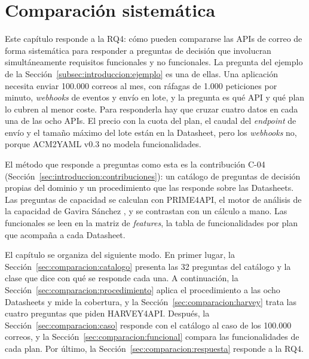 \chapter{Comparación sistemática}
\label{cap:comparacion}

Este capítulo responde a la RQ4: cómo pueden compararse las APIs de correo de forma sistemática para responder a preguntas de decisión que involucran simultáneamente requisitos funcionales y no funcionales.
La pregunta del ejemplo de la Sección~\ref{subsec:introduccion:ejemplo} es una de ellas.
Una aplicación necesita enviar 100.000 correos al mes, con ráfagas de 1.000 peticiones por minuto, \textit{webhooks} de eventos y envío en lote, y la pregunta es qué API y qué plan lo cubren al menor coste.
Para responderla hay que cruzar cuatro datos en cada una de las ocho APIs.
El precio con la cuota del plan, el caudal del \textit{endpoint} de envío y el tamaño máximo del lote están en la Datasheet, pero los \textit{webhooks} no, porque ACM2YAML v0.3 no modela funcionalidades.

El método que responde a preguntas como esta es la contribución C-04 (Sección~\ref{sec:introduccion:contribuciones}): un catálogo de preguntas de decisión propias del dominio y un procedimiento que las responde sobre las Datasheets.
Las preguntas de capacidad se calculan con PRIME4API, el motor de análisis de la capacidad de Gavira Sánchez \citep{gavira2026tfm}, y se contrastan con un cálculo a mano.
Las funcionales se leen en la matriz de \textit{features}, la tabla de funcionalidades por plan que acompaña a cada Datasheet.

El capítulo se organiza del siguiente modo.
En primer lugar, la Sección~\ref{sec:comparacion:catalogo} presenta las 32 preguntas del catálogo y la clase que dice con qué se responde cada una.
A continuación, la Sección~\ref{sec:comparacion:procedimiento} aplica el procedimiento a las ocho Datasheets y mide la cobertura, y la Sección~\ref{sec:comparacion:harvey} trata las cuatro preguntas que piden HARVEY4API.
Después, la Sección~\ref{sec:comparacion:caso} responde con el catálogo al caso de los 100.000 correos, y la Sección~\ref{sec:comparacion:funcional} compara las funcionalidades de cada plan.
Por último, la Sección~\ref{sec:comparacion:respuesta} responde a la RQ4.







